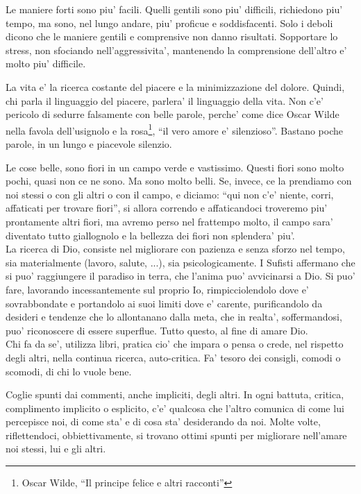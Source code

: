 Le maniere forti sono piu' facili. Quelli gentili sono piu' difficili, richiedono piu' tempo, ma sono, nel lungo andare, piu' proficue e soddisfacenti. Solo i deboli dicono che le maniere gentili e comprensive non danno risultati. Sopportare lo stress, non sfociando nell'aggressivita', mantenendo la comprensione dell'altro e' molto piu' difficile. 

La vita e' la ricerca costante del piacere e la minimizzazione del dolore. Quindi, chi parla il linguaggio del piacere, parlera' il linguaggio della vita. Non c'e' pericolo di sedurre falsamente con belle parole, perche' come dice Oscar Wilde nella favola dell'usignolo e la rosa\footnote{Oscar Wilde, ``Il principe felice e altri racconti''}, ``il vero amore e' silenzioso''. Bastano poche parole, in un lungo e piacevole silenzio.

Le cose belle, sono fiori in un campo verde e vastissimo. Questi fiori sono molto pochi, quasi non ce ne sono. Ma sono molto belli. Se, invece, ce la prendiamo con noi stessi o con gli altri o con il campo, e diciamo: ``qui non c'e' niente, corri, affaticati per trovare fiori'', si allora correndo e affaticandoci troveremo piu' prontamente altri fiori, ma avremo perso nel frattempo molto, il campo sara' diventato tutto giallognolo e la bellezza dei fiori non splendera' piu'.\\

La ricerca di Dio, consiste nel migliorare con pazienza e senza sforzo nel tempo, sia materialmente (lavoro, salute, ...), sia psicologicamente. I Sufisti affermano che si puo' raggiungere il paradiso in terra, che l'anima puo' avvicinarsi a Dio. Si puo' fare, lavorando incessantemente sul proprio Io, rimpicciolendolo dove e' sovrabbondate e portandolo ai suoi limiti dove e' carente, purificandolo da desideri e tendenze che lo allontanano dalla meta, che in realta', soffermandosi, puo' riconoscere di essere superflue. Tutto questo, al fine di amare Dio. \\

Chi fa da se', utilizza libri, pratica cio' che impara o pensa o crede, nel rispetto degli altri, nella continua ricerca, auto-critica. Fa' tesoro dei consigli, comodi o scomodi, di chi lo vuole bene.

Coglie spunti dai commenti, anche impliciti, degli altri. In ogni battuta, critica, complimento implicito o esplicito, c'e' qualcosa che l'altro comunica di come lui percepisce noi, di come sta' e di cosa sta' desiderando da noi. Molte volte, riflettendoci, obbiettivamente, si trovano ottimi spunti per migliorare nell'amare noi stessi, lui e gli altri.

